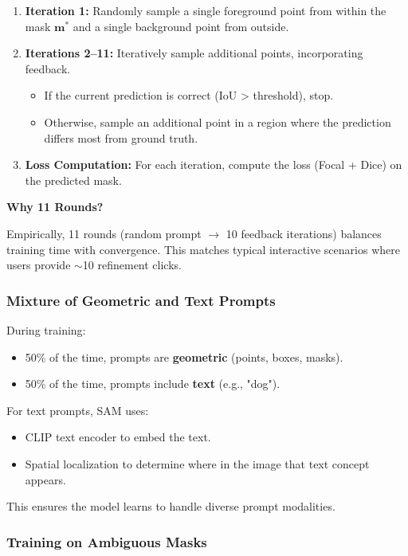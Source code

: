 \begin{enumerate}
    \item \textbf{Iteration 1:} Randomly sample a single foreground point from within the mask $\mathbf{m}^*$ and a single background point from outside.
    \item \textbf{Iterations 2–11:} Iteratively sample additional points, incorporating feedback.
    \begin{itemize}
        \item If the current prediction is correct (IoU > threshold), stop.
        \item Otherwise, sample an additional point in a region where the prediction differs most from ground truth.
    \end{itemize}

    \item \textbf{Loss Computation:} For each iteration, compute the loss (Focal + Dice) on the predicted mask.
\end{enumerate}

\textbf{Why 11 Rounds?}

Empirically, 11 rounds (random prompt $\rightarrow$ 10 feedback iterations) balances training time with convergence. This matches typical interactive scenarios where users provide $\sim$10 refinement clicks.

\subsubsection{Mixture of Geometric and Text Prompts}

During training:
\begin{itemize}
    \item 50\% of the time, prompts are \textbf{geometric} (points, boxes, masks).
    \item 50\% of the time, prompts include \textbf{text} (e.g., "dog").
\end{itemize}

For text prompts, SAM uses:
\begin{itemize}
    \item CLIP text encoder to embed the text.
    \item Spatial localization to determine where in the image that text concept appears.
\end{itemize}

This ensures the model learns to handle diverse prompt modalities.

\subsubsection{Training on Ambiguous Masks}

